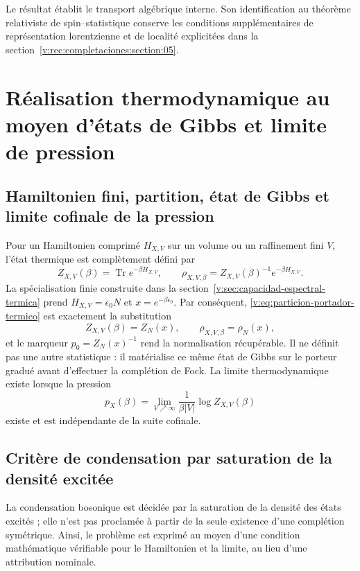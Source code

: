 Le résultat établit le transport algébrique interne. Son identification
au théorème relativiste de spin--statistique conserve les conditions
supplémentaires de représentation lorentzienne et de localité explicitées dans la
section~\ref{v:rec:completaciones:section:05}.

\clearpage
\section{Réalisation thermodynamique au moyen d’états de Gibbs et limite de pression}
\label{v:rec:fock_gibbs:section:04}

\subsection{Hamiltonien fini, partition, état de Gibbs et limite cofinale de la pression}
\label{v:rec:fock_gibbs:section:05}

Pour un Hamiltonien comprimé \(H_{X,V}\) sur un volume ou un raffinement
fini \(V\), l’état thermique est complètement défini par
\[
 Z_{X,V}(\beta)=\operatorname{Tr}e^{-\beta H_{X,V}},
 \qquad
 \rho_{X,V,\beta}=Z_{X,V}(\beta)^{-1}e^{-\beta H_{X,V}}.
\]
La spécialisation finie construite dans la
section~\ref{v:sec:capacidad-espectral-termica} prend
$H_{X,V}=\epsilon_0N$ et $x=e^{-\beta\epsilon_0}$. Par conséquent,
\eqref{v:eq:particion-portador-termico} est exactement la substitution
\[
 Z_{X,V}(\beta)=Z_N(x),\qquad
 \rho_{X,V,\beta}=\rho_N(x),
\]
et le marqueur $p_0=Z_N(x)^{-1}$ rend la normalisation récupérable. Il ne
définit pas une autre statistique : il matérialise ce même état de Gibbs sur le
porteur gradué avant d’effectuer la complétion de Fock.
La limite thermodynamique existe lorsque la pression
\[
 p_X(\beta)=\lim_{V\nearrow\infty}
 \frac1{\beta |V|}\log Z_{X,V}(\beta)
\]
existe et est indépendante de la suite cofinale.

\subsection{Critère de condensation par saturation de la densité excitée}
\label{v:rec:fock_gibbs:section:06}

La condensation bosonique est
décidée par la saturation de la densité des états excités ; elle n’est pas proclamée à
partir de la seule existence d’une complétion symétrique. Ainsi, le problème
est exprimé au moyen d’une condition mathématique vérifiable pour le
Hamiltonien et la limite, au lieu d’une attribution nominale.
